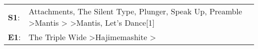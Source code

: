 \begin{supertabular}{p{0.03\textwidth}p{0.92\textwidth}}
 \textbf{S1}:  &  Attachments\textsuperscript{}, \enspace The Silent Type\textsuperscript{}, \enspace Plunger\textsuperscript{}, \enspace Speak Up\textsuperscript{}, \enspace Preamble\textsuperscript{} \textgreater \enspace Mantis\textsuperscript{} \textgreater {}\textsuperscript{} \textgreater \enspace Mantis\textsuperscript{}, \enspace Let's Dance[1]\textsuperscript{}  \enspace  \\
 \textbf{E1}:  &                                                                                                                                                                                                                                           The Triple Wide\textsuperscript{} \textgreater \enspace Hajimemashite\textsuperscript{} \textgreater {}\textsuperscript{}  \enspace  \\
\end{supertabular}

